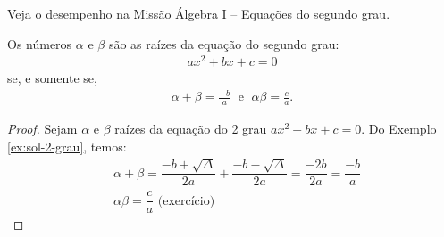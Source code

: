 \begin{onlineact}
Veja o desempenho na Missão Álgebra I -- Equações do segundo grau.
\end{onlineact}

\begin{theorem}
Os números $\alpha$ e $\beta$ são as raízes da equação do segundo grau:
%
\begin{align*}
ax^2+ bx+c=0
\end{align*}
se, e somente se,
\begin{align*}
\alpha + \beta = \frac {-b} a \; \text{ e } \; \alpha \beta = \frac c a.
\end{align*}
\end{theorem}

\begin{proof}
Sejam $\alpha$ e $\beta$ raízes da equação do 2\tdeg{} grau $ax^2+bx+c=0$. Do Exemplo \ref{ex:sol-2-grau}, temos:
%
\begin{align*}
	& \alpha+\beta=\dfrac{-b+\sqrt\Delta}{2a}+\dfrac{-b-\sqrt\Delta}{2a}=\dfrac{-2b}{2a}=\dfrac{-b}{a}\\
	& \alpha\beta=\dfrac{c}{a} \text{ (exercício)}
\end{align*}
\end{proof}